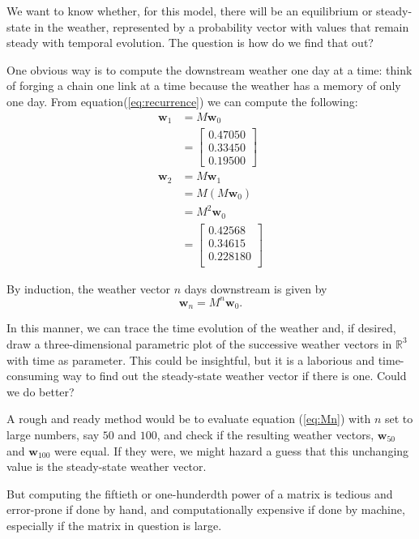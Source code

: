 \documentclass[
  12pt,
  a4paper,
]{article}
\begin{document}
We want to know whether, for this model, there will be an equilibrium or
steady-state in the weather, represented by a probability vector with
values that remain steady with temporal evolution. The question is how
do we find that out?

One obvious way is to compute the downstream weather one day at a time:
think of forging a chain one link at a time because the weather has a
memory of only one day. From equation(\ref{eq:recurrence}) we can
compute the following: \[
\begin{aligned}
\boldsymbol{w}_{1} &= M\boldsymbol {w}_{0}\\
&= \begin{bmatrix}0.47050\\ 0.33450\\0.19500\end{bmatrix}\\
\boldsymbol{w}_{2} &= M\boldsymbol{w}_{1}\\
&= M(M\boldsymbol{w}_{0})\\
&= M^{2}\boldsymbol{w}_{0}\\
&= \begin{bmatrix}0.42568\\0.34615\\0.228180\\\end{bmatrix}
\end{aligned}
\]

By induction, the weather vector \(n\) days downstream is given by
\begin{equation}
\boldsymbol{w}_{n} = M^{n}\boldsymbol{w}_{0}.
\label{eq:Mn}\end{equation}

In this manner, we can trace the time evolution of the weather and, if
desired, draw a three-dimensional parametric plot of the successive
weather vectors in \(\mathbb{R}^{3}\) with time as parameter. This could
be insightful, but it is a laborious and time-consuming way to find out
the steady-state weather vector if there is one. Could we do better?

A rough and ready method would be to evaluate equation (\ref{eq:Mn})
with \(n\) set to large numbers, say \(50\) and \(100\), and check if
the resulting weather vectors, \(\boldsymbol{w}_{50}\) and
\(\boldsymbol{w}_{100}\) were equal. If they were, we might hazard a
guess that this unchanging value is the steady-state weather vector.

But computing the fiftieth or one-hunderdth power of a matrix is tedious
and error-prone if done by hand, and computationally expensive if done
by machine, especially if the matrix in question is large.
\end{document}
